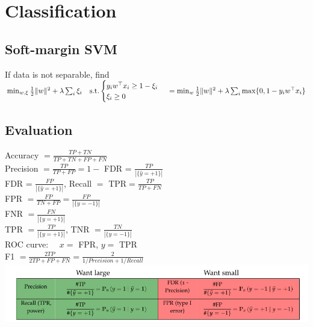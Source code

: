 \section*{Classification}

\subsection*{Soft-margin SVM}
If data is not separable, find \\
$\min_{w,\xi}\frac{1}{2}\|w\|^2  +\lambda\sum_i\xi_i\ \ \ 
\text{s.t.} \begin{cases}
    y_iw^\top x_i\geq 1-\xi_i\\
    \xi_i\geq0
\end{cases}\\
=\min_w\frac{1}{2}\|w\|^2+\lambda\sum_i\max \{0,1-y_i w^\top x_i\}$


\subsection*{Evaluation}
Accuracy $=\frac{TP+TN}{TP+TN+FP+FN}$\\
Precision $=\frac{TP}{TP+FP} = 1-$ FDR = $\frac{TP}{|\{\hat{y} = +1\}|}$\\
FDR = $\frac{FP}{|\{\hat{y} = +1\}|}$, Recall $=$ TPR$ =\frac{TP}{TP+FN}$\\
FPR $=\frac{FP}{TN+FP} = \frac{FP}{|\{y = -1\}|}$\\
FNR $=\frac{FN}{|\{ y = +1 \}|}$\\
TPR $=\frac{TP}{|\{ y = +1 \}|}$, TNR $=\frac{TN}{|\{ y = -1 \}|}$\\
ROC curve: \ \ $x=$ FPR, $y=$ TPR\\
F1 $=\frac{2TP}{2TP+FP+FN}=\frac{2}{1/Precision+1/Recall}$\\
\hspace*{-5mm}
\includegraphics[width=1.1 \linewidth]{matrix.png}
